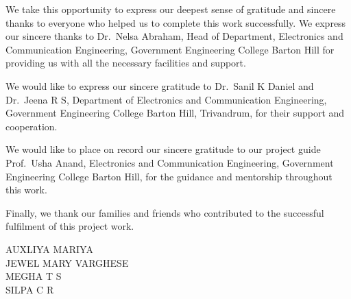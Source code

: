 We take this opportunity to express our deepest sense of gratitude and sincere
thanks to everyone who helped us to complete this work successfully. We express
our sincere thanks to Dr.\ Nelsa Abraham, Head of Department, Electronics and
Communication Engineering, Government Engineering College Barton Hill for
providing us with all the necessary facilities and support.

We would like to express our sincere gratitude to Dr.\ Sanil K Daniel and
Dr.\ Jeena R S, Department of Electronics and Communication Engineering,
Government Engineering College Barton Hill, Trivandrum, for their support and
cooperation.

We would like to place on record our sincere gratitude to our project guide
Prof.\ Usha Anand, Electronics and Communication Engineering, Government
Engineering College Barton Hill, for the guidance and mentorship throughout
this work.

Finally, we thank our families and friends who contributed to the successful
fulfilment of this project work.

\vspace{1cm}
\begin{flushright}
AUXLIYA MARIYA\\[4pt]
JEWEL MARY VARGHESE\\[4pt]
MEGHA T S\\[4pt]
SILPA C R
\end{flushright}

\clearpage
\tableofcontents
\clearpage
{}
\listoffigures
\clearpage
{}
\listoftables

\clearpage
